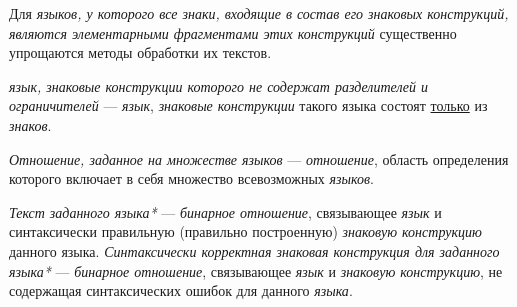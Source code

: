 Для \textit{языков, у которого все знаки, входящие в состав его знаковых конструкций, являются элементарными фрагментами этих конструкций} существенно упрощаются методы обработки их текстов.

\textit{язык, знаковые конструкции которого не содержат разделителей и ограничителей} --- \textit{язык}, \textit{знаковые конструкции} такого языка состоят \underline{только} из \textit{знаков}.

\textit{Отношение, заданное на множестве языков\scnsupergroupsign} --- \textit{отношение}, область определения которого включает в себя множество всевозможных \textit{языков}.

\textit{Текст заданного языка*} --- \textit{бинарное отношение}, связывающее \textit{язык} и синтаксически правильную (правильно построенную) \textit{знаковую конструкцию} данного языка.
\textit{Синтаксически корректная знаковая конструкция для заданного языка*} --- \textit{бинарное отношение}, связывающее \textit{язык} и \textit{знаковую конструкцию}, не содержащая синтаксических ошибок для данного \textit{языка}.

